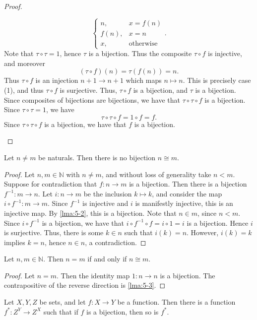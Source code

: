 \documentclass[11pt, letterpaper]{article}
\theoremstyle{definition}
\begin{document}
\begin{proof}
\begin{enumerate}[label=(\arabic*), align=right]
\[\begin{cases}
				n, & x=f(n) \\
				f(n), & x=n \\
				x, & \text{otherwise} 
			\end{cases}
		.\]
		Note that $\tau \circ \tau =1$, hence $\tau $ is a bijection. Thus the composite $\tau \circ f$ is injective, and moreover
		\[
			(\tau \circ f)(n) = \tau (f(n)) = n
		.\]
		Thus $\tau \circ f$ is an injection $n+1\to n+1$ which maps $n\mapsto n$. This is precisely case (1), and thus $\tau \circ f$ is surjective. Thus, $\tau \circ f$ is a bijection, and $\tau $ is a bijection. Since composites of bijections are bijections, we have that $\tau \circ \tau \circ f$ is a bijection. Since $\tau \circ \tau =1$, we have
	\[
		\tau \circ \tau \circ f = 1\circ f=f
	.\]
	Since $\tau \circ \tau \circ f$ is a bijection, we have that $f$ is a bijection.
	\end{enumerate}
\end{proof}
\begin{lemma}\label{lma:5-3}
	Let $n \neq m$ be naturals. Then there is no bijection $n \cong m$.
\end{lemma}
\begin{proof}
	Let $n,m\in\mathbb{N} $ with $n\neq m$, and without loss of generality take $n<m$. Suppose for contradiction that $f : n \to m$ is a bijection. Then there is a bijection $f^{-1} : m \to n$. Let $i : n \to m$ be the inclusion $k\mapsto k$, and consider the map $i\circ f^{-1} : m \to m$. Since $f^{-1}$ is injective and $i$ is manifestly injective, this is an injective map. By \cref{lma:5-2}, this is a bijection. Note that $n\in m$, since $n<m$. Since $i\circ f^{-1} $ is a bijection, we have that $i\circ f^{-1} \circ f=i\circ 1=i$ is a bijection. Hence $i$ is surjective. Thus, there is some $k\in n$ such that $i(k) = n$. However, $i(k)=k$ implies $k=n$, hence $n\in n$, a contradiction.
\end{proof}
\begin{corollary}\label{cor:5-4}
	Let $n,m\in\mathbb{N} $. Then $n=m$ if and only if $n \cong m$.
\end{corollary}
\begin{proof}
	Let $n=m$. Then the identity map $1 : n \to n$ is a bijection. The contrapositive of the reverse direction is \cref{lma:5-3}.
\end{proof}
\begin{lemma}\label{lma:5-5}
	Let $X,Y,Z$ be sets, and let $f : X \to  Y$ be a function. Then there is a function $ f^* : Z^Y \to Z^X$ such that if $f$ is a bijection, then so is $f^*$.
\end{lemma}
\end{document}
